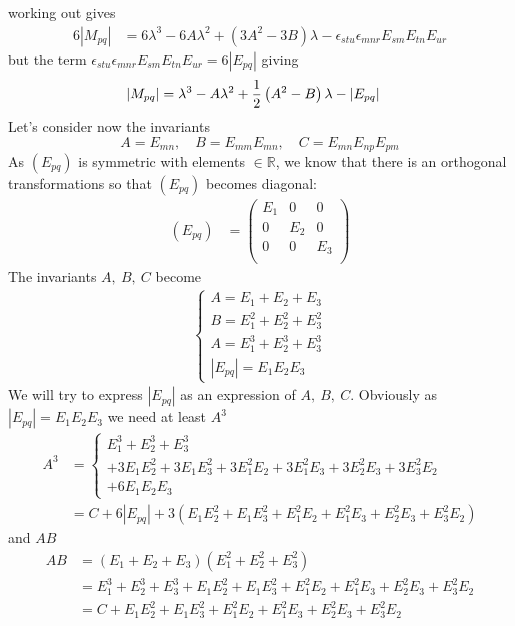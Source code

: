 working out gives 
\begin{align}
6\left|M_{pq}\right|&= 6\lambda^3-6A\lambda^2 +\left(3A^2-3B\right)\lambda-\epsilon_{stu}\epsilon_{mnr}E_{sm}E_{tn}E_{ur}
\end{align}
but the term $\epsilon_{stu}\epsilon_{mnr}E_{sm}E_{tn}E_{ur}=6\left|E_{pq}\right|$
giving 
\begin{align}
\left|M_{pq}\right|&= \lambda^3-A\lambda^2 +\frac{1}{2}\left(A^2-B\right)\lambda-\left|E_{pq}\right|
\end{align}
Let's consider now the invariants $$A=E_{mn},\quad B=E_{mm}E_{mn}, \quad C= E_{mn}E_{np}E_{pm}$$
As $(E_{pq})$ is symmetric with  elements $\in \mathbb{R}$, we know that there is an orthogonal transformations so that $(E_{pq})$ becomes diagonal:
\begin{align}
(E_{pq})&= \left(\begin{matrix}
E_1&0&0\\
0&E_2&0\\
0&0&E_3\\
\end{matrix}\right)
\end{align}
The invariants $A, \ B,\ C$ become
\begin{align}
\left\{\begin{array}{l}
A= E_1+E_2+E_3\\
B= E_1^2+E_2^2 +E_3^2\\
A= E_1^3+E_2^3+E_3^3\\
\left|E_{pq}\right|= E_1E_2E_3
\end{array}\right.
\end{align}
We will try to express $\left|E_{pq}\right|$ as an expression of $A, \ B,\ C$. Obviously as $\left|E_{pq}\right|= E_1E_2E_3$ we need at least $A^3$  
\begin{align}
A^3&= \left\{\begin{array}{l}E_1^3+E_2^3+E_3^3\\+3E_1E_2^2+3E_1E_3^2+3E_1^2E_2+3E_1^2E_3+3E_2^2E_3+3E_3^2E_2\\
+ 6E_1E_2E_3
\end{array}\right.\\
&= C+6\left|E_{pq}\right|+3\left(E_1E_2^2+E_1E_3^2+E_1^2E_2+E_1^2E_3+E_2^2E_3+E_3^2E_2\right)
\end{align}
and $AB$
\begin{align}
AB&= \left(E_1+E_2+E_3\right)\left(E_1^2+E_2^2 +E_3^2\right)\\
&= E_1^3+E_2^3 +E_3^3+ E_1E_2^2+E_1E_3^2+E_1^2E_2+E_1^2E_3+E_2^2E_3+E_3^2E_2\\
&= C+ E_1E_2^2+E_1E_3^2+E_1^2E_2+E_1^2E_3+E_2^2E_3+E_3^2E_2
\end{align}

